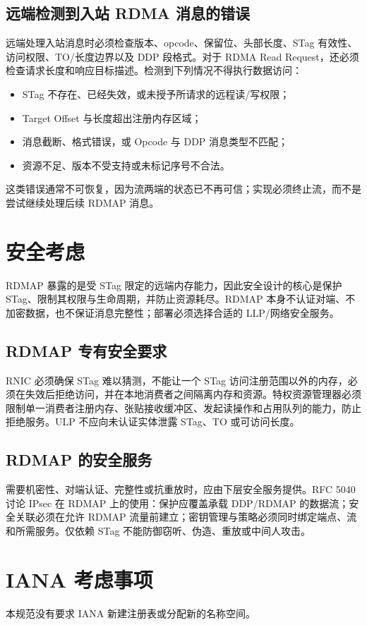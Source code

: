 \documentclass[11pt,a4paper]{article}
\begin{document}
\subsection{远端检测到入站 RDMA 消息的错误}
远端处理入站消息时必须检查版本、opcode、保留位、头部长度、STag 有效性、访问权限、TO/长度边界以及 DDP 段格式。对于 RDMA Read Request，还必须检查请求长度和响应目标描述。检测到下列情况不得执行数据访问：
\begin{itemize}
\item STag 不存在、已经失效，或未授予所请求的远程读/写权限；
\item Target Offset 与长度超出注册内存区域；
\item 消息截断、格式错误，或 Opcode 与 DDP 消息类型不匹配；
\item 资源不足、版本不受支持或未标记序号不合法。
\end{itemize}
这类错误通常不可恢复，因为流两端的状态已不再可信；实现必须终止流，而不是尝试继续处理后续 RDMAP 消息。
\section{安全考虑}
RDMAP 暴露的是受 STag 限定的远端内存能力，因此安全设计的核心是保护 STag、限制其权限与生命周期，并防止资源耗尽。RDMAP 本身不认证对端、不加密数据，也不保证消息完整性；部署必须选择合适的 LLP/网络安全服务。
\subsection{RDMAP 专有安全要求}
RNIC 必须确保 STag 难以猜测，不能让一个 STag 访问注册范围以外的内存，必须在失效后拒绝访问，并在本地消费者之间隔离内存和资源。特权资源管理器必须限制单一消费者注册内存、张贴接收缓冲区、发起读操作和占用队列的能力，防止拒绝服务。ULP 不应向未认证实体泄露 STag、TO 或可访问长度。
\subsection{RDMAP 的安全服务}
需要机密性、对端认证、完整性或抗重放时，应由下层安全服务提供。RFC 5040 讨论 IPsec 在 RDMAP 上的使用：保护应覆盖承载 DDP/RDMAP 的数据流；安全关联必须在允许 RDMAP 流量前建立；密钥管理与策略必须同时绑定端点、流和所需服务。仅依赖 STag 不能防御窃听、伪造、重放或中间人攻击。
\section{IANA 考虑事项}
本规范没有要求 IANA 新建注册表或分配新的名称空间。
\end{document}
